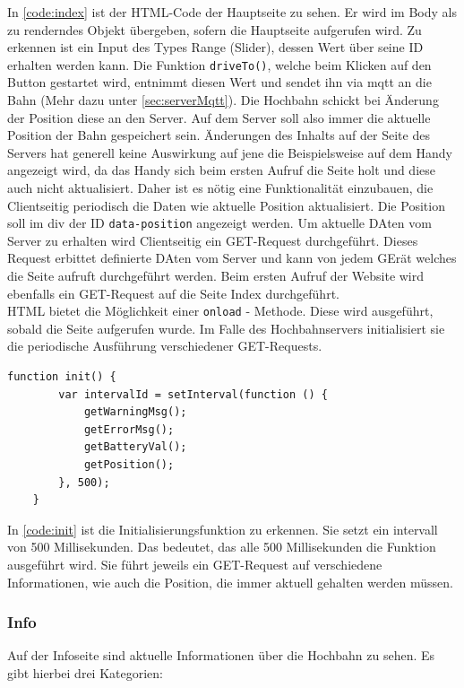 In \autoref{code:index} ist der HTML-Code der Hauptseite zu sehen. Er wird im Body als zu renderndes Objekt übergeben, sofern die Hauptseite aufgerufen wird. Zu erkennen ist ein Input des Types Range (Slider), dessen Wert über seine ID erhalten werden kann. Die Funktion \texttt{driveTo()}, welche beim Klicken auf den Button gestartet wird, entnimmt diesen Wert und sendet ihn via \acrshort{mqtt} an die Bahn (Mehr dazu unter \autoref{sec:serverMqtt}). Die Hochbahn schickt bei Änderung der Position diese an den Server. Auf dem Server soll also immer die aktuelle Position der Bahn gespeichert sein. Änderungen des Inhalts auf der Seite des Servers hat generell keine Auswirkung auf jene die Beispielsweise auf dem Handy angezeigt wird, da das Handy sich beim ersten Aufruf die Seite holt und diese auch nicht aktualisiert. Daher ist es nötig eine Funktionalität einzubauen, die Clientseitig periodisch die Daten wie aktuelle Position aktualisiert. Die Position soll im div der ID \texttt{data-position} angezeigt werden. Um aktuelle DAten vom Server zu erhalten wird Clientseitig ein GET-Request durchgeführt. Dieses Request erbittet definierte DAten vom Server und kann von jedem GErät welches die Seite aufruft durchgeführt werden. Beim ersten Aufruf der Website wird ebenfalls ein GET-Request auf die Seite Index durchgeführt. \\
HTML bietet die Möglichkeit einer \texttt{onload} - Methode. Diese wird ausgeführt, sobald die Seite aufgerufen wurde. Im Falle des Hochbahnservers initialisiert sie die periodische Ausführung verschiedener GET-Requests. 
\vspace{0.5cm}
\begin{lstlisting}[language=html, style=dhpaperdefault]
	function init() {
		var intervalId = setInterval(function () {
			getWarningMsg();
			getErrorMsg();
			getBatteryVal();
			getPosition();
		}, 500);
	}
\end{lstlisting}
\vspace{1cm}
In \autoref{code:init} ist die Initialisierungsfunktion zu erkennen. Sie setzt ein intervall von 500 Millisekunden. Das bedeutet, das alle 500 Millisekunden die Funktion ausgeführt wird. Sie führt jeweils ein GET-Request auf verschiedene Informationen, wie auch die Position, die immer aktuell gehalten werden müssen. 

\subsubsection{Info}
Auf der Infoseite sind aktuelle Informationen über die Hochbahn zu sehen. Es gibt hierbei drei Kategorien:

